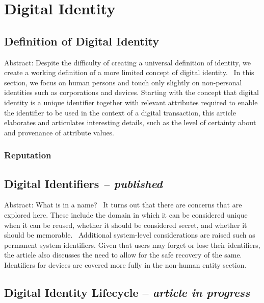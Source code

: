 \hypertarget{digital-identity}{%
\chapter{Digital Identity}\label{digital-identity}}

\hypertarget{definition-of-digital-identity}{%
\section{Definition of Digital
Identity}\label{definition-of-digital-identity}}

Abstract: Despite the difficulty of creating a universal definition of
identity, we create a working definition of a more limited concept of
digital identity.~ In this section, we focus on human persons and touch
only slightly on non-personal identities such as corporations and
devices. Starting with the concept that digital identity is a unique
identifier together with relevant attributes required to enable the
identifier to be used in the context of a digital transaction, this
article elaborates and articulates interesting details, such as the
level of certainty about and provenance of attribute values.

\hypertarget{reputation}{%
\subsection{Reputation}\label{reputation}}

\hypertarget{digital-identifiers-published}{%
\section{\texorpdfstring{Digital Identifiers \emph{--
published}}{Digital Identifiers -- published}}\label{digital-identifiers-published}}

Abstract: What is in a name?~ It turns out that there are concerns that
are explored here. These include the domain in which it can be
considered unique when it can be reused, whether it should be considered
secret, and whether it should be memorable.~ Additional system-level
considerations are raised such as permanent system identifiers. Given
that users may forget or lose their identifiers, the article also
discusses the need to allow for the safe recovery of the same.
Identifiers for devices are covered more fully in the non-human entity
section.

\hypertarget{digital-identity-lifecycle-article-in-progress}{%
\section{\texorpdfstring{Digital Identity Lifecycle -- \emph{article
in
progress}}{Digital Identity Lifecycle -- article in progress}}\label{digital-identity-lifecycle-article-in-progress}}

